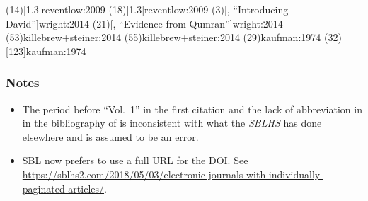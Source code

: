 \documentclass[a4paper]{article}
\begin{document}
\examplecite(14)[1.3]{reventlow:2009}
\examplecite(18)[1.3]{reventlow:2009}
\examplecite(3)[, \mkbibquote{Introducing David}]{wright:2014}
\examplecite(21)[, \mkbibquote{Evidence from Qumran}]{wright:2014}
\examplecite(53){killebrew+steiner:2014}
\examplecite(55){killebrew+steiner:2014}
\examplecite(29){kaufman:1974}
\examplecite(32)[123]{kaufman:1974}
\exampleabbreviations
\examplebibliography

\subsubsection{Notes}

\begin{itemize}
  \item The period before ``Vol.~1'' in the first citation and the lack of
    abbreviation in in the bibliography of  is
    inconsistent with what the \emph{SBLHS} has done elsewhere and is assumed
    to be an error.
  \item SBL now prefers to use a full URL for the DOI. See
    \url{https://sblhs2.com/2018/05/03/electronic-journals-with-individually-paginated-articles/}.
\end{itemize}
\end{document}
